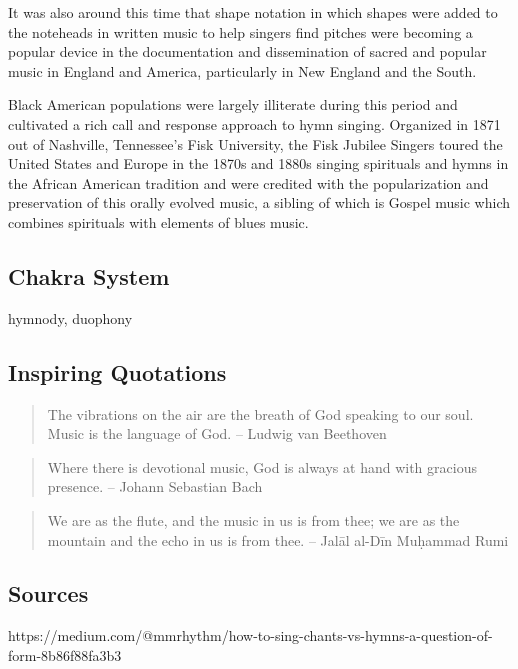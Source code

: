\documentclass[12pt]{article}
\begin{document}
It was also around this time that shape notation in which shapes were added to the noteheads in written music to help singers find pitches were becoming a popular device in the documentation and dissemination of sacred and popular music in England and America, particularly in New England and the South.

Black American populations were largely illiterate during this period and cultivated a rich call and response approach to hymn singing. Organized in 1871 out of Nashville, Tennessee's Fisk University, the Fisk Jubilee Singers toured the United States and Europe in the 1870s and 1880s singing spirituals and hymns in the African American tradition and were credited with the popularization and preservation of this orally evolved music, a sibling of which is Gospel music which combines spirituals with elements of blues music.



\subsection*{Chakra System}

hymnody, duophony
\subsection*{Inspiring Quotations}

\begin{quote}
  The vibrations on the air are the breath of God speaking to our soul. Music is the language of God. – Ludwig van Beethoven
\end{quote}

\begin{quote}
  Where there is devotional music, God is always at hand with gracious presence. – Johann Sebastian Bach
\end{quote}

\begin{quote}
  We are as the flute, and the music in us is from thee; we are as the mountain and the echo in us is from thee. – Jalāl al-Dīn Muḥammad Rumi
\end{quote}




\subsection*{Sources}

https://medium.com/@mmrhythm/how-to-sing-chants-vs-hymns-a-question-of-form-8b86f88fa3b3
\end{document}
